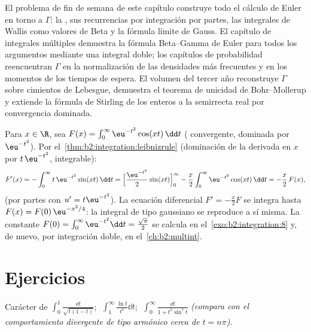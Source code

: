 \begin{remark}
El problema de fin de semana de este capítulo construye todo el
cálculo de Euler en torno a $\Gamma$: la , sus
recurrencias por integración por partes, las integrales de Wallis
como valores de Beta y la fórmula límite de Gauss. El capítulo de
integrales múltiples demuestra la fórmula Beta--Gamma de Euler para
todos los argumentos mediante una integral doble; los capítulos de
probabilidad reencuentran $\Gamma$ en la normalización de las
densidades más frecuentes y en los momentos de los tiempos de
espera. El volumen del tercer año reconstruye $\Gamma$ sobre
cimientos de Lebesgue, demuestra el teorema de unicidad de
Bohr--Mollerup y extiende la fórmula de Stirling de los enteros a la
semirrecta real por convergencia dominada.
\end{remark}

\begin{example}\label{ex:b2:integration:laplace}
Para $x \in \R$, sea $F(x) = \int_0^{\infty} \eu^{-t^2}\cos(xt)\,\dd
t$ ( convergente, dominada por $\eu^{-t^2}$). Por el~\cref{thm:b2:integration:leibnizrule} (dominación de la derivada en
$x$ por $t\,\eu^{-t^2}$, integrable):
\[
F'(x) = -\int_0^\infty t\,\eu^{-t^2}\sin(xt)\,\dd t
= \Bigl[\frac{\eu^{-t^2}}{2}\sin(xt)\Bigr]_0^\infty
- \frac x2\int_0^\infty \eu^{-t^2}\cos(xt)\,\dd t
= -\frac x2\,F(x),
\]
(por partes con $u' = t\eu^{-t^2}$). La ecuación diferencial $F' =
-\frac x2 F$ se integra hasta $F(x) = F(0)\,\eu^{-x^2/4}$: la
integral de tipo gaussiano se reproduce a sí misma. La constante
$F(0) = \int_0^\infty \eu^{-t^2}\dd t = \frac{\sqrt\pi}{2}$ se
calcula en el~\cref{exo:b2:integration:8} y, de nuevo, por
integración doble, en el~\cref{ch:b2:multint}.
\end{example}

\section{Ejercicios}

\begin{exercise}[$\star$]\label{exo:b2:integration:1}
Carácter de $\displaystyle\int_0^1 \frac{\dd t}{\sqrt{t(1-t)}}$;
$\;\displaystyle\int_1^\infty \frac{\ln t}{t^2}\dd t$;
$\;\displaystyle\int_0^\infty \frac{\dd t}{1 + t^2\sin^2 t}$
\emph{(compara con el comportamiento divergente de tipo armónico
cerca de $t = n\pi$)}.
\end{exercise}

